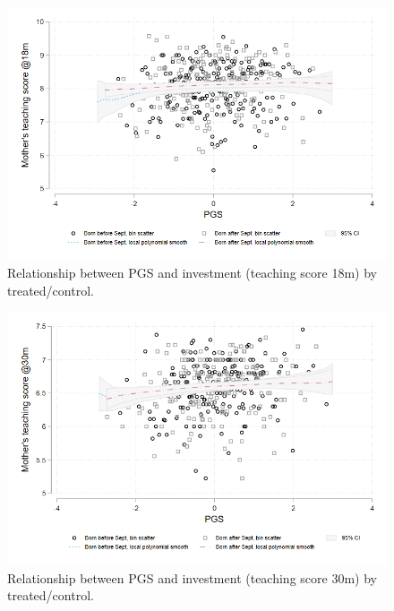 \documentclass{article}
\begin{document}
\begin{figure}[H]
\centering 
\includegraphics[width=1\linewidth]{../figures/PGSxTreat_teach18m.png}
\caption{Relationship between PGS and investment (teaching score 18m) by treated/control.}
\label{fig:PGSxTreat_teach18m}
\end{figure}

\begin{figure}[H]
\centering 
\includegraphics[width=1\linewidth]{../figures/PGSxTreat_teach30m.png}
\caption{Relationship between PGS and investment (teaching score 30m) by treated/control.}
\label{fig:PGSxTreat_teach30m}
\end{figure}
\end{document}
